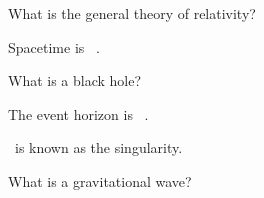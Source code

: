 \documentclass[addpoints]{exam}
\begin{document}
\begin{questions}


\question
What is the general theory of relativity?

\question
Spacetime is \fillin\ .

\question
What is a black hole?

\question
The event horizon is \fillin\ .

\question
\fillin\ is known as the singularity.

\question
What is a gravitational wave?


\end{questions}
\end{document}
